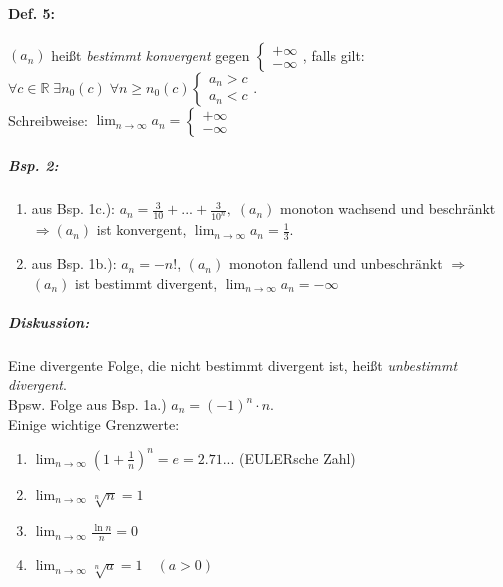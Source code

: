 \paragraph{Def. 5:} \parskp
$(a_n)$ heißt \emph{bestimmt konvergent} gegen $\begin{cases}
+\infty\\
- \infty
\end{cases}$, falls gilt: $\forall c \in \mathbb{R} \; \exists n_0(c) \; \forall n \geq n_0(c) \begin{cases}
a_n>c\\
a_n<c
\end{cases}$.\\
Schreibweise: $\boxed{\lim_{n\to \infty} a_n = \begin{cases}
+\infty\\
- \infty
\end{cases}}$
\subparagraph{Bsp. 2:} 
\begin{enumerate}[label=\alph*.)]
\item aus Bsp. 1c.): $a_n=\frac{3}{10}+...+\frac{3}{10^n}, \; (a_n)$ monoton wachsend und beschränkt $\Rightarrow (a_n)$ ist konvergent, $\lim_{n\to \infty}a_n = \frac{1}{3}$. 
\item aus Bsp. 1b.): $a_n=-n!$, $(a_n)$ monoton fallend und unbeschränkt $\Rightarrow$ $(a_n)$ ist bestimmt divergent, $\lim_{n\to \infty}a_n=-\infty$
\end{enumerate}
\subparagraph{Diskussion:}\parskp
Eine divergente Folge, die nicht bestimmt divergent ist, heißt \emph{unbestimmt divergent}.\\
Bpsw. Folge aus Bsp. 1a.) $a_n=(-1)^n\cdot n$.\bigskip\\
Einige wichtige Grenzwerte:
\begin{enumerate} [label=\alph*.)]
\item $\lim_{n\to \infty} \left(1+\frac{1}{n}\right)^n=e=2.71...$ (EULERsche Zahl)
\item $\lim_{n\to\infty} \sqrt[n]{n}=1$
\item $\lim_{n\to\infty} \frac{\ln n}{n}=0$
\item $\lim_{n \to \infty} \sqrt[n]{a}=1 \quad (a>0)$
\end{enumerate}
